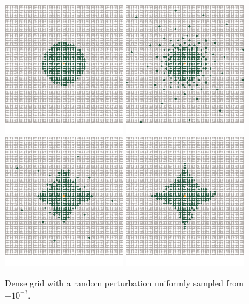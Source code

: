 \documentclass[review,supplement,onefignum,onetabnum]{siamonline220329}
\begin{document}
\begin{figure}[H]
  \centering
  \includegraphics{figures/precompiled/grid_1e-3/points_1.pdf}%
  \quad
  \includegraphics{figures/precompiled/grid_1e-3/points_2.pdf}%
  \quad
  \includegraphics{figures/precompiled/grid_1e-3/points_3.pdf}%
  \quad
  \includegraphics{figures/precompiled/grid_1e-3/points_4.pdf}%
  \caption{%
    Dense grid with a random perturbation
    uniformly sampled from \( \pm 10^{-3} \).
  }
\end{figure}
\end{document}
